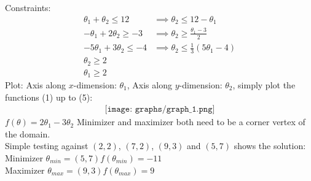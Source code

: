 

\newcommand{\ExerciseNumber}{07}

\newcommand{\PersonOne}{Marcel Bruckner (03674122)}
\newcommand{\PersonTwo}{Julian Hohenadel (03673879)}
\newcommand{\PersonThree}{Kevin Bein (03707775)}






%
%
%
\begin{flushleft}
Constraints:\\
\begin{align}
\theta_1 + \theta_2 \leq 12 &\implies \theta_2 \leq 12 - \theta_1\\
- \theta_1 + 2\theta_2 \geq -3 &\implies \theta_2 \geq \frac{\theta_1-3}{2}\\
- 5\theta_1 + 3\theta_2 \leq -4 &\implies \theta_2 \leq \frac{1}{3}(5\theta_1-4)\\
\theta_2 \geq 2\\
\theta_1 \geq 2
\end{align}
Plot: Axis along $x$-dimension: $\theta_1$, Axis along $y$-dimension: $\theta_2$, simply plot the functions (1) up to (5):
\begin{align*}
\texttt{[image: graphs/graph\_1.png]}
\end{align*}
$f(\theta)=2\theta_1 -3\theta_2$ Minimizer and maximizer both need to be a corner vertex of the domain.\\
Simple testing against $(2,2)$, $(7,2)$, $(9,3)$ and $(5,7)$ shows the solution:\\
Minimizer $\theta_{min} = (5,7) f(\theta_{min})= -11$\\
Maximizer $\theta_{max} = (9,3) f(\theta_{max})= 9$\\
\end{flushleft}
%
%
%

%
%
%

%
%
%

%
%



